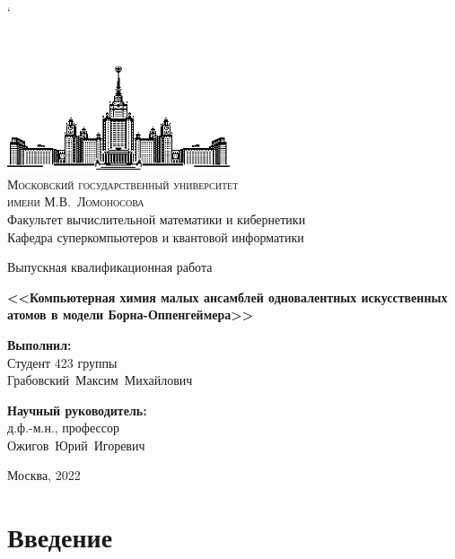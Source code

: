 \documentclass[12pt, a4paper]{article}
\begin{document}
`
\thispagestyle{empty}
\begin{center}
\ \vspace{-2cm}

\includegraphics[width=0.5\textwidth]{msu.eps}\\
{\scshape Московский государственный университет \\ имени М.В.~Ломоносова}\\
Факультет вычислительной математики и кибернетики\\
Кафедра суперкомпьютеров и квантовой информатики

\vspace{3cm}

{\LARGE Выпускная квалификационная работа}

\vspace{1cm}

{\Huge\bfseries
<<Компьютерная химия малых ансамблей одновалентных искусственных атомов в модели Борна-Оппенгеймера>>\\}
\end{center}
\vspace{3cm}
\vfill

\begin{flushright}
  \large
  \textbf{Выполнил:}\\
  Студент 423 группы\\
  Грабовский~Максим~Михайлович

  \vspace{5mm}

  \textbf{Научный руководитель:}\\
  д.ф.-м.н., профессор\\
  Ожигов~Юрий~Игоревич
\end{flushright}

\vfill

\begin{center}
Москва, 2022
\end{center}
\enlargethispage{4\baselineskip}
\newpage

\tableofcontents
\newpage
\section{Введение}
\end{document}
